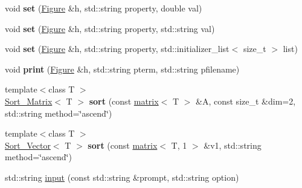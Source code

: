 \begin{DoxyCompactItemize}
\item 
\hypertarget{namespacekeycpp_afcd6ae07fc18f5374868fe314f00108c}{void {\bfseries set} (\hyperlink{classkeycpp_1_1_figure}{Figure} \&h, std\-::string property, double val)}\label{namespacekeycpp_afcd6ae07fc18f5374868fe314f00108c}

\item 
\hypertarget{namespacekeycpp_a53fd8f41e3cdddb0dcca913eef5ee329}{void {\bfseries set} (\hyperlink{classkeycpp_1_1_figure}{Figure} \&h, std\-::string property, std\-::string val)}\label{namespacekeycpp_a53fd8f41e3cdddb0dcca913eef5ee329}

\item 
\hypertarget{namespacekeycpp_ae67eb981ff22ef79a4ee90a9a40ae21f}{void {\bfseries set} (\hyperlink{classkeycpp_1_1_figure}{Figure} \&h, std\-::string property, std\-::initializer\-\_\-list$<$ size\-\_\-t $>$ list)}\label{namespacekeycpp_ae67eb981ff22ef79a4ee90a9a40ae21f}

\item 
\hypertarget{namespacekeycpp_af9dec3da4533a1db21a6c6c4fe8e740a}{void {\bfseries print} (\hyperlink{classkeycpp_1_1_figure}{Figure} \&h, std\-::string pterm, std\-::string pfilename)}\label{namespacekeycpp_af9dec3da4533a1db21a6c6c4fe8e740a}

\item 
\hypertarget{namespacekeycpp_abe567d1c5cdf91722dfbe5da89e859e8}{{\footnotesize template$<$class T $>$ }\\\hyperlink{structkeycpp_1_1_sort___matrix}{Sort\-\_\-\-Matrix}$<$ T $>$ {\bfseries sort} (const \hyperlink{classkeycpp_1_1matrix}{matrix}$<$ T $>$ \&A, const size\-\_\-t \&dim=2, std\-::string method=\char`\"{}ascend\char`\"{})}\label{namespacekeycpp_abe567d1c5cdf91722dfbe5da89e859e8}

\item 
\hypertarget{namespacekeycpp_abf76824e94d38e4d242af792576701f5}{{\footnotesize template$<$class T $>$ }\\\hyperlink{structkeycpp_1_1_sort___vector}{Sort\-\_\-\-Vector}$<$ T $>$ {\bfseries sort} (const \hyperlink{classkeycpp_1_1matrix}{matrix}$<$ T, 1 $>$ \&v1, std\-::string method=\char`\"{}ascend\char`\"{})}\label{namespacekeycpp_abf76824e94d38e4d242af792576701f5}

\item 
\hypertarget{namespacekeycpp_aba69db64fe38ad271de1939d3f1a5520}{std\-::string \hyperlink{namespacekeycpp_aba69db64fe38ad271de1939d3f1a5520}{input} (const std\-::string \&prompt, std\-::string option)}\label{namespacekeycpp_aba69db64fe38ad271de1939d3f1a5520}


\end{DoxyCompactItemize}
